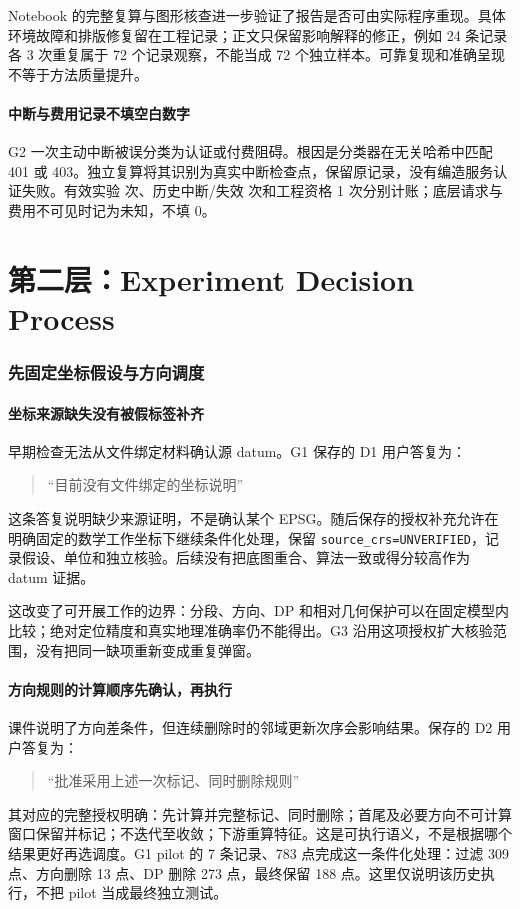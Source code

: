 \documentclass[11pt,a4paper]{article}
\begin{document}
Notebook 的完整复算与图形核查进一步验证了报告是否可由实际程序重现。具体环境故障和排版修复留在工程记录；正文只保留影响解释的修正，例如 24 条记录各 3 次重复属于 72 个记录观察，不能当成 72 个独立样本。可靠复现和准确呈现不等于方法质量提升。

\subsection{中断与费用记录不填空白数字}
G2 一次主动中断被误分类为认证或付费阻碍。根因是分类器在无关哈希中匹配 401 或 403。独立复算将其识别为真实中断检查点，保留原记录，没有编造服务认证失败。有效实验 \ValidModelCalls{} 次、历史中断/失效 \HistoricModelCalls{} 次和工程资格 1 次分别计账；底层请求与费用不可见时记为未知，不填 0。



\clearpage
\part*{第二层：Experiment Decision Process}

\section{先固定坐标假设与方向调度}\label{sec:technical-authorization}
\subsection{坐标来源缺失没有被假标签补齐}
早期检查无法从文件绑定材料确认源 datum。G1 保存的 D1 用户答复为：
\begin{quote}“目前没有文件绑定的坐标说明”\end{quote}
这条答复说明缺少来源证明，不是确认某个 EPSG。随后保存的授权补充允许在明确固定的数学工作坐标下继续条件化处理，保留 \texttt{source\_crs=UNVERIFIED}，记录假设、单位和独立核验。后续没有把底图重合、算法一致或得分较高作为 datum 证据。

这改变了可开展工作的边界：分段、方向、DP 和相对几何保护可以在固定模型内比较；绝对定位精度和真实地理准确率仍不能得出。G3 沿用这项授权扩大核验范围，没有把同一缺项重新变成重复弹窗。

\subsection{方向规则的计算顺序先确认，再执行}
课件说明了方向差条件，但连续删除时的邻域更新次序会影响结果。保存的 D2 用户答复为：
\begin{quote}“批准采用上述一次标记、同时删除规则”\end{quote}
其对应的完整授权明确：先计算并完整标记、同时删除；首尾及必要方向不可计算窗口保留并标记；不迭代至收敛；下游重算特征。这是可执行语义，不是根据哪个结果更好再选调度。G1 pilot 的 7 条记录、783 点完成这一条件化处理：过滤 309 点、方向删除 13 点、DP 删除 273 点，最终保留 188 点。这里仅说明该历史执行，不把 pilot 当成最终独立测试。
\end{document}
